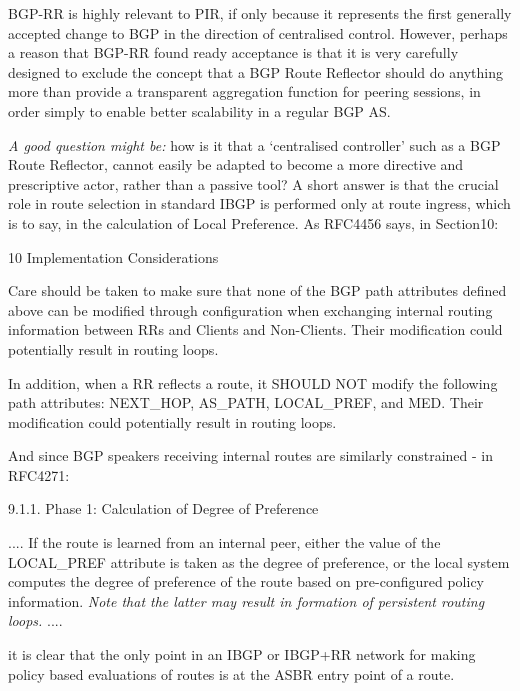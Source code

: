 BGP-RR is highly relevant to PIR, if only because it represents the first
generally accepted change to BGP in the direction of centralised control.
However, perhaps a reason that BGP-RR found ready acceptance is that it is very
carefully designed to exclude the concept that a BGP Route Reflector should do
anything more than provide a transparent aggregation function for peering
sessions, in order simply to enable better scalability in a regular BGP AS.

\emph{A good question might be:} how is it that a `centralised controller' such
as a BGP Route Reflector, cannot easily be adapted to become a more directive
and prescriptive actor, rather than a passive tool?  A short answer is that the
crucial role in route selection in standard IBGP is performed only at route
ingress, which is to say, in the calculation of Local Preference.
As RFC4456 says, in Section10:
\begin{myquote}
	10 Implementation Considerations

	Care should be taken to make sure that none of the BGP path
	attributes defined above can be modified through configuration when
	exchanging internal routing information between RRs and Clients and
	Non-Clients.  Their modification could potentially result in routing
	loops.

	In addition, when a RR reflects a route, it SHOULD NOT modify the
	following path attributes: NEXT\_HOP, AS\_PATH, LOCAL\_PREF, and MED.
	Their modification could potentially result in routing loops.

\end{myquote}

And since BGP speakers receiving internal routes are similarly constrained - 
in RFC4271:
\begin{myquote}
	9.1.1.  Phase 1: Calculation of Degree of Preference

	....
	If the route is learned from an internal peer, either the value of
	the LOCAL\_PREF attribute is taken as the degree of preference, or
	the local system computes the degree of preference of the route
	based on pre-configured policy information.	\emph{Note that the latter
	may result in formation of persistent routing loops.}
	....

\end{myquote}

it is clear that the only point in an IBGP or IBGP+RR network for making policy
based evaluations of routes is at the ASBR entry point of a route.

